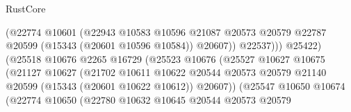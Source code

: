 \begin{lexlean}{RustCore}
\begin{coremodule}
                                                (@22774
                                                  @10601
                                                  (@22943
                                                    @10583
                                                    @10596
                                                    @21087
                                                    @20573
                                                    @20579
                                                    @22787
                                                    @20599
                                                    (@15343 (@20601 @10596 @10584))
                                                    @20607))
                                                @22537)))
                                          @25422)
                                        (@25518
                                          @10676
                                          @2265
                                          @16729
                                          (@25523
                                            @10676
                                            (@25527
                                              @10627
                                              @10675
                                              (@21127
                                                @10627
                                                (@21702
                                                  @10611
                                                  @10622
                                                  @20544
                                                  @20573
                                                  @20579
                                                  @21140
                                                  @20599
                                                  (@15343 (@20601 @10622 @10612))
                                                  @20607))
                                              (@25547
                                                @10650
                                                @10674
                                                (@22774
                                                  @10650
                                                  (@22780
                                                    @10632
                                                    @10645
                                                    @20544
                                                    @20573
                                                    @20579

\end{coremodule}
\end{lexlean}
